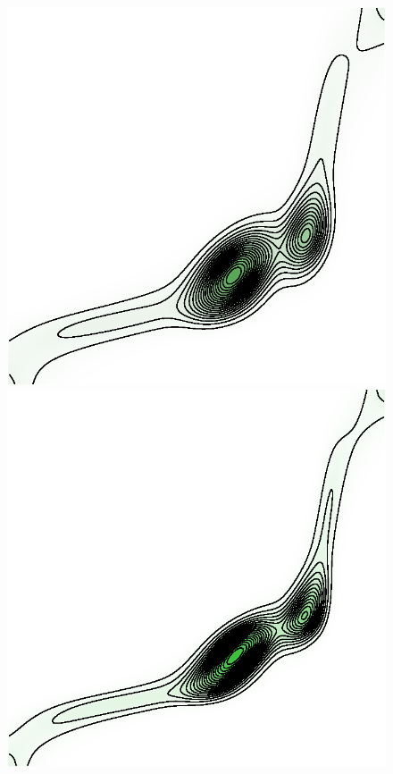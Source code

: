 \documentclass[cn,10pt,math=newtx,citestyle=gb7714-2015,bibstyle=gb7714-2015]{elegantbook}
\begin{document}
\begin{figure}[H]
\begin{minipage}{0.8\linewidth}
\begin{minipage}{0.19\linewidth}
\begin{mdframed}
		\end{mdframed}
	\end{minipage}
	\begin{minipage}{0.19\linewidth}
		\centering
		\begin{mdframed}
		    \includegraphics[width=\linewidth]{figure/fig4.4/evol-levelsets-33.eps}
		\end{mdframed}
	\end{minipage}
	\begin{minipage}{0.19\linewidth}
		\centering
		\begin{mdframed}
		    \includegraphics[width=\linewidth]{figure/fig4.4/evol-levelsets-38.eps}

\end{mdframed}
\end{minipage}
\end{minipage}
\end{figure}
\end{document}

